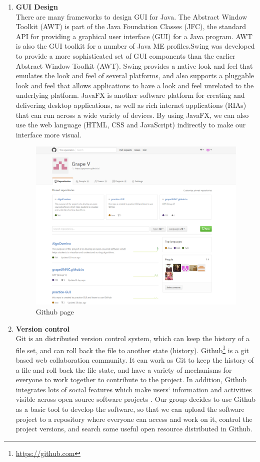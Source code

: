 \documentclass[paper=a4, fontsize=11pt,twoside]{scrartcl}		%
\begin{document}
\begin{enumerate}
	\item \textbf{GUI Design}\\
    There are many frameworks to design GUI for Java. The Abstract Window Toolkit (AWT) is part of the Java Foundation Classes (JFC), the standard API for providing a graphical user interface (GUI) for a Java program. AWT is also the GUI toolkit for a number of Java ME profiles.Swing was developed to provide a more sophisticated set of GUI components than the earlier Abstract Window Toolkit (AWT). Swing provides a native look and feel that emulates the look and feel of several platforms, and also supports a pluggable look and feel that allows applications to have a look and feel unrelated to the underlying platform. JavaFX is another software platform for creating and delivering desktop applications, as well as rich internet applications (RIAs) that can run across a wide variety of devices. By using JavaFX, we can also use the web language (HTML, CSS and JavaScript) indirectly to make our interface more visual.

\begin{figure}[htbp]
\centering
\includegraphics[width=.8\textwidth]{github.PNG}
\caption{Github page}
\label{github}
\end{figure}
	\item \textbf{Version control}\\
    Git is an distributed version control system, which can keep the history of a file set, and can roll back the file to another state (history). Github\footnote{\url{https://github.com}} is a git based web collaboration community. It can work as Git to keep the history of a file and roll back the file state, and have a variety of mechanisms for everyone to work together to contribute to the project. In addition, Github integrates lots of social features which make users` information and activities visible across open source software projects \cite{dabbish2012social}. Our group decides to use Github as a basic tool to develop the software, so that we can upload the software project to a repository where everyone can access and work on it, control the project versions, and search some useful open resource distributed in Github. 


\end{enumerate}
\end{document}
